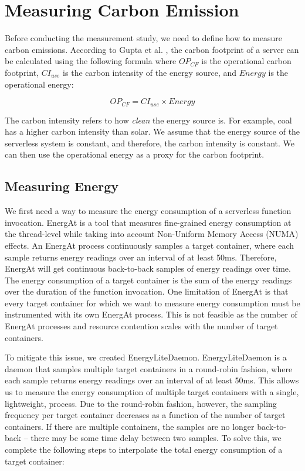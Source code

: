 \documentclass[times, 10pt,twocolumn]{article}
\begin{document}
\section{Measuring Carbon Emission}


Before conducting the measurement study, we need to define how to measure carbon emissions. According to Gupta et al. \cite{gupta2022act}, the carbon footprint of a server can be calculated using the following formula where $OP_{CF}$ is the operational carbon footprint, $CI_{use}$ is the carbon intensity of the energy source, and $Energy$ is the operational energy:

\begin{equation}
   OP_{CF} = CI_{use} \times Energy
\end{equation}

The carbon intensity refers to how \textit{clean} the energy source is. For example, coal has a higher carbon intensity than solar. We assume that the energy source of the serverless system is constant, and therefore, the carbon intensity is constant. We can then use the operational energy as a proxy for the carbon footprint.

\subsection{Measuring Energy}
We first need a way to measure the energy consumption of a serverless function invocation. EnergAt \cite{he2023hotcarbon} is a tool that measures fine-grained energy consumption at the thread-level while taking into account Non-Uniform Memory Access (NUMA) effects. An EnergAt process continuously samples a target container, where each sample returns energy readings over an interval of at least 50ms. Therefore, EnergAt will get continuous back-to-back samples of energy readings over time. The energy consumption of a target container is the sum of the energy readings over the duration of the function invocation. One limitation of EnergAt is that every target container for which we want to measure energy consumption must be instrumented with its own EnergAt process. This is not feasible as the number of EnergAt processes and resource contention scales with the number of target containers.

To mitigate this issue, we created EnergyLiteDaemon. EnergyLiteDaemon is a daemon that samples multiple target containers in a round-robin fashion, where each sample returns energy readings over an interval of at least 50ms. This allows us to measure the energy consumption of multiple target containers with a single, lightweight, process. Due to the round-robin fashion, however, the sampling frequency per target container decreases as a function of the number of target containers. If there are multiple containers, the samples are no longer back-to-back -- there may be some time delay between two samples. To solve this, we complete the following steps to interpolate the total energy consumption of a target container:
\end{document}
